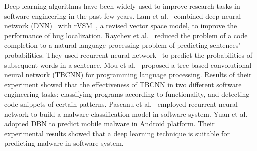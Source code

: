 Deep learning algorithms have been widely used to improve research tasks in software engineering in the past few years. Lam et al.~\cite{lam2015combining} combined deep neural network (DNN)~\cite{hecht1988theory} with rVSM~\cite{zhou2012should}, a revised vector space model, to improve the performance of bug localization. Raychev et al.~\cite{raychev2014code} reduced the problem of a code completion to a natural-language processing problem of predicting sentences' probabilities. They used recurrent neural network~\cite{mikolov2010recurrent} to predict the probabilities of subsequent words in a sentence. Mou et al.~\cite{mou2014tbcnn} proposed a tree-based convolutional neural network (TBCNN) for programming language processing. Results of their experiment showed that the effectiveness of TBCNN  in two different software engineering tasks: classifying programs according to functionality, and detecting code snippets of certain patterns. Pascanu et al.~\cite{pascanu2015malware} employed recurrent neural network to build a malware classification model in software system. Yuan et al.~\cite{yuan2014droid} adopted DBN to predict mobile malware in Android platform. Their experimental results showed that a deep learning technique is suitable for predicting malware in software system.                            


